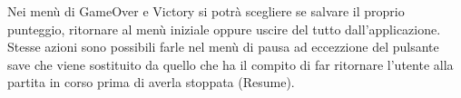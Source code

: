 \documentclass[a4paper,12pt]{report}
\begin{document}
Nei menù di GameOver e Victory si potrà scegliere se salvare il proprio punteggio,
ritornare al menù iniziale oppure uscire del tutto dall'applicazione. Stesse azioni sono
possibili farle nel menù di pausa ad eccezzione del pulsante save che viene sostituito da quello che
ha il compito di far ritornare l'utente alla partita in corso prima di averla stoppata (Resume).
\end{document}
